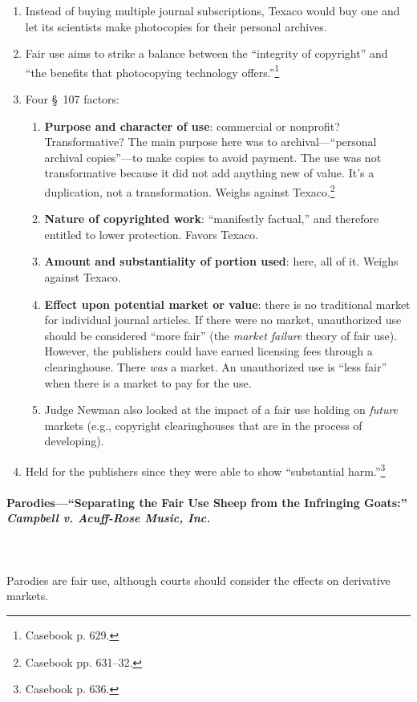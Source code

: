 \begin{enumerate}
    \item Instead of buying multiple journal subscriptions, Texaco would buy 
    one and let its scientists make photocopies for their personal archives.
    \item Fair use aims to strike a balance between the ``integrity of 
    copyright'' and ``the benefits that photocopying technology 
    offers.''\footnote{Casebook p. 629.}
    \item Four \S\ 107 factors:
    \begin{enumerate}
        \item \textbf{Purpose and character of use}: commercial or nonprofit? 
        Transformative? The main purpose here was to archival---``personal 
        archival copies''---to make copies to avoid payment. The use was not 
        transformative because it did not add anything new of 
        value. It's a duplication, not a transformation. 
        Weighs against Texaco.\footnote{Casebook pp. 631--32.}
        \item \textbf{Nature of copyrighted work}: ``manifestly factual,'' and 
        therefore entitled to lower protection. Favors Texaco.
        \item \textbf{Amount and substantiality of portion used}: here, all of 
        it. Weighs against Texaco.
        \item \textbf{Effect upon potential market or value}: there is no 
        traditional market for individual journal articles. If there were no 
        market, unauthorized use should be considered ``more fair'' (the 
        \emph{market failure} theory of fair use). However, the publishers 
        could have earned licensing fees through a clearinghouse. There 
        \emph{was} a market. An unauthorized use is ``less fair'' when there 
        is a market to pay for the use.
        \item Judge Newman also looked at the impact of a fair use holding on 
        \emph{future} markets (e.g., copyright clearinghouses that are in the 
        process of developing).
    \end{enumerate}
    \item Held for the publishers since they were able to show ``substantial 
    harm.''\footnote{Casebook p. 636.}
\end{enumerate}

\paragraph{Parodies---``Separating the Fair Use Sheep from the Infringing 
Goats:'' \emph{Campbell v. Acuff-Rose Music, Inc.}}
~\\\\
Parodies are fair use, although courts should consider the effects on 
derivative markets.

